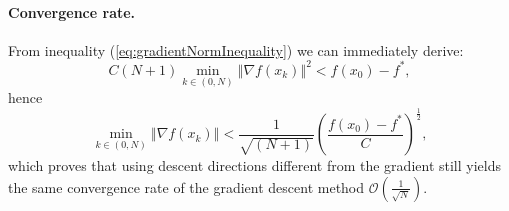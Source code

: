 \documentclass{article}
\newcommand{\norm}[1]{\left\Vert #1 \right\Vert}
\begin{document}
\paragraph{Convergence rate.}
From inequality (\ref{eq:gradientNormInequality}) we can immediately derive:
\begin{equation}
	C(N+1)\min_{k\in(0,N)} \norm{\nabla f(x_k)}^2  < f(x_0)-f^*,
\end{equation}
hence
\begin{equation}
\min_{k\in(0,N)} \norm{\nabla f(x_k)} < \frac{1}{\sqrt{(N+1)}}\left(\frac{f(x_0)-f^*}{C}\right)^{\frac{1}{2}},
\end{equation}
which proves that using descent directions different from the gradient still yields the same convergence rate of the gradient descent method $\mathcal{O}(\frac{1}{\sqrt{N}})$. 
 
\end{document}
